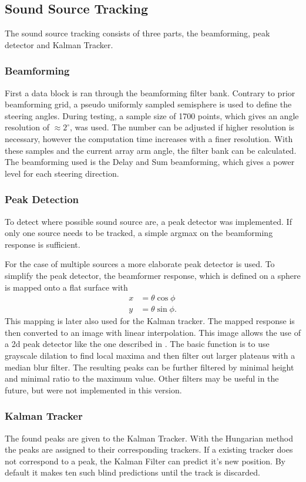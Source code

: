\subsection{Sound Source Tracking}
The sound source tracking consists of three parts, the beamforming, peak detector and
Kalman Tracker.

\subsubsection{Beamforming}
First a data block is ran through the beamforming filter bank.
Contrary to prior beamforming grid, a pseudo uniformly sampled
semisphere is used to define the steering angles.
During testing, a sample size of 1700 points, which
gives an angle resolution of $\approx 2^\circ$, was used.
The number can be adjusted if higher resolution is necessary, however
the computation time increases with a finer resolution.
With these samples and the current array arm angle, the filter bank can be
calculated.
The beamforming used is the Delay and Sum beamforming,
which gives a power level for each steering direction.

\subsubsection{Peak Detection}
To detect where possible sound source are, a peak detector was implemented.
If only one source needs to be tracked, a simple argmax on the beamforming
response is sufficient.

For the case of multiple sources a more elaborate peak detector is used.
To simplify the peak detector, the beamformer response, which is defined on
a sphere is mapped onto a flat surface with
\begin{align}
	x & = \theta \cos\phi  \\
	y & = \theta \sin\phi.
	\label{eq:maping}
\end{align}
This mapping is later also used for the Kalman tracker.
The mapped response is then converted to an image with linear interpolation.
This image allows the use of a 2d peak detector like the one described in
\cite{cvpeakdet}.
The basic function is to use grayscale dilation to find local maxima
and then filter out larger plateaus with a
median blur filter.
The resulting peaks can be further filtered by minimal height and
minimal ratio to the maximum value.
Other filters may be useful in the future, but were not implemented in this version.

\subsubsection{Kalman Tracker}
The found peaks are given to the Kalman Tracker.
With the Hungarian method the peaks are assigned to their corresponding
trackers.
If a existing tracker does not correspond to a peak, the Kalman
Filter can predict it's new position.
By default it makes ten such blind predictions until the track is discarded.


